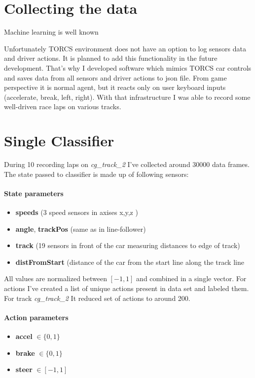 \documentclass[declaration,shortabstract,english,inz]{iithesis}
\begin{document}
\section{Collecting the data}

Machine learning is well known 

Unfortunately TORCS environment does not have an option to log sensors data and driver actions. It is planned to add this functionality in the future development. That's why I developed software which mimics TORCS car controls and saves data from all sensors and driver actions to json file. From game perspective it is normal agent, but it reacts only on user keyboard inputs (accelerate, break, left, right).  With that infrastructure I was able to record some well-driven race laps on various tracks.  

\section{Single Classifier}

During 10 recording laps on \textit{cg\_track\_2} I've collected around 30000 data frames. The state passed to classifier is made up of following sensors:

\paragraph{State parameters}
\begin{itemize}
    \item \textbf{speeds} (3 speed sensors in axises x,y,z )
    \item \textbf{angle}, \textbf{trackPos} (same as in line-follower) 
    \item \textbf{track}  (19 sensors in front of the car measuring distances to edge of track) 
    \item \textbf{distFromStart} (distance of the car from the start line along the track line
\end{itemize}

All values are normalized between $[-1,1]$ and combined in a single vector. For actions I've created a list of unique actions present in data set and labeled them. For track \textit{cg\_track\_2} It reduced set of actions to around 200. 

\paragraph{Action parameters}
\begin{itemize}
    \item \textbf{accel} $\in \{0,1\}$
    \item \textbf{brake} $\in \{0,1\}$ 
    \item \textbf{steer} $\in [-1,1]$
\end{itemize}
\end{document}
